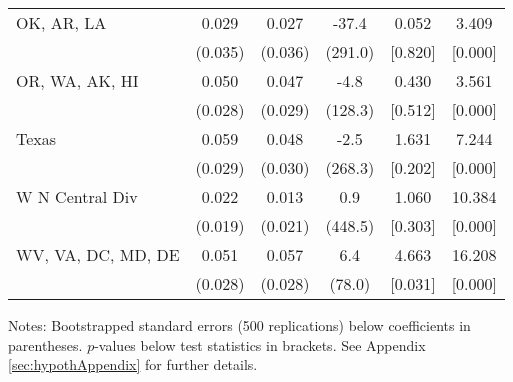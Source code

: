 \begin{landscape}
\begin{table}[ht]
{\begin{threeparttable}
\begin{tabular}{lccccc}
OK, AR, LA & 0.029 & 0.027 & -37.4 & 0.052 & 3.409 \\ 
 & (0.035) & (0.036) & (291.0) & [0.820] & [0.000] \\ 
OR, WA, AK, HI & 0.050 & 0.047 & -4.8 & 0.430 & 3.561 \\ 
 & (0.028) & (0.029) & (128.3) & [0.512] & [0.000] \\ 
Texas & 0.059 & 0.048 & -2.5 & 1.631 & 7.244 \\ 
 & (0.029) & (0.030) & (268.3) & [0.202] & [0.000] \\ 
W N Central Div & 0.022 & 0.013 & 0.9 & 1.060 & 10.384 \\ 
 & (0.019) & (0.021) & (448.5) & [0.303] & [0.000] \\ 
WV, VA, DC, MD, DE & 0.051 & 0.057 & 6.4 & 4.663 & 16.208 \\ 
 & (0.028) & (0.028) & (78.0) & [0.031] & [0.000] \\ 
\bottomrule
\end{tabular}
{\footnotesize {\raggedright Notes: Bootstrapped standard errors (500 replications) below coefficients in parentheses. $p$-values below test statistics in brackets. See Appendix \ref{sec:hypothAppendix} for further details.}}
\end{threeparttable}
}
\end{table}
\end{landscape}
